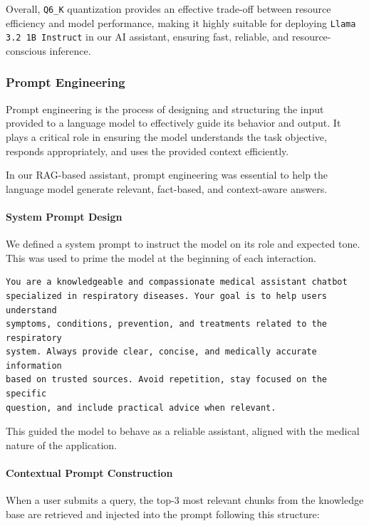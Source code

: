 Overall, \texttt{Q6\_K} quantization provides an effective trade-off between resource efficiency and model performance, making it highly suitable for deploying \texttt{Llama 3.2 1B Instruct} in our AI assistant, ensuring fast, reliable, and resource-conscious inference.

\subsubsection{Prompt Engineering}
\label{sssec:prompt-engineering}

Prompt engineering is the process of designing and structuring the input provided to a language model to effectively guide its behavior and output. It plays a critical role in ensuring the model understands the task objective, responds appropriately, and uses the provided context efficiently.

In our RAG-based assistant, prompt engineering was essential to help the language model generate relevant, fact-based, and context-aware answers.

\paragraph{System Prompt Design}
We defined a system prompt to instruct the model on its role and expected tone. This was used to prime the model at the beginning of each interaction.

\begin{verbatim}
You are a knowledgeable and compassionate medical assistant chatbot 
specialized in respiratory diseases. Your goal is to help users understand 
symptoms, conditions, prevention, and treatments related to the respiratory 
system. Always provide clear, concise, and medically accurate information 
based on trusted sources. Avoid repetition, stay focused on the specific 
question, and include practical advice when relevant.
\end{verbatim}

This guided the model to behave as a reliable assistant, aligned with the medical nature of the application.

\paragraph{Contextual Prompt Construction} 
When a user submits a query, the top-3 most relevant chunks from the knowledge base are retrieved and injected into the prompt following this structure:

